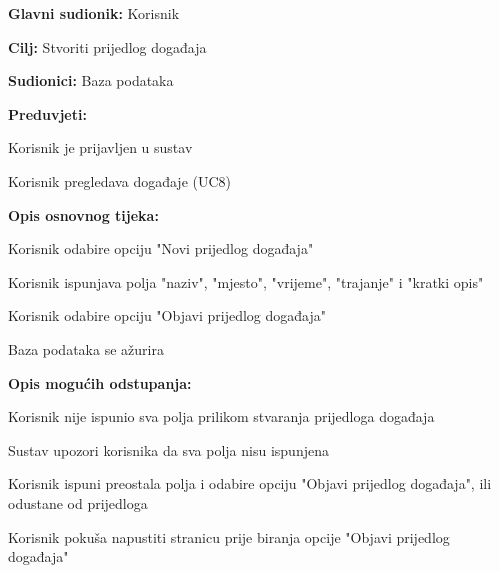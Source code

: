 					\begin{packed_item}
	
						\item \textbf{Glavni sudionik: }Korisnik
						\item  \textbf{Cilj:} Stvoriti prijedlog događaja
						\item  \textbf{Sudionici:} Baza podataka
						\item  \textbf{Preduvjeti:}
						\item[] \begin{packed_enum}
							\item Korisnik je prijavljen u sustav
							\item Korisnik pregledava događaje (UC8)
						\end{packed_enum}
						\item  \textbf{Opis osnovnog tijeka:}
						
						\item[] \begin{packed_enum}
	
							\item Korisnik odabire opciju "Novi prijedlog događaja" 
							\item Korisnik ispunjava polja "naziv", "mjesto", "vrijeme", "trajanje" i "kratki opis"
							\item Korisnik odabire opciju "Objavi prijedlog događaja"
							\item Baza podataka se ažurira
						\end{packed_enum}
						
						\item  \textbf{Opis mogućih odstupanja:}
						
						\item[] \begin{packed_item}
	
							\item[3.a] Korisnik nije ispunio sva polja prilikom stvaranja prijedloga događaja
							\item[] \begin{packed_enum}
								
								\item Sustav upozori korisnika da sva polja nisu ispunjena
								\item Korisnik ispuni preostala polja i odabire opciju "Objavi prijedlog događaja", ili odustane od prijedloga
							\end{packed_enum}
								
							\item[3.b] Korisnik pokuša napustiti stranicu prije biranja opcije "Objavi prijedlog događaja"
							\item[] \begin{packed_enum}
								

\end{packed_enum}
\end{packed_item}
\end{packed_item}
